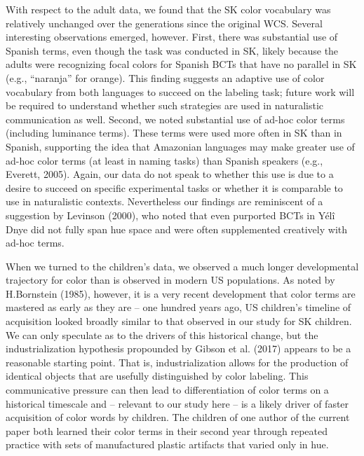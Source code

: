 \documentclass[
  english,
  ,man,floatsintext]{apa6}
\begin{document}
With respect to the adult data, we found that the SK color vocabulary was relatively unchanged over the generations since the original WCS. Several interesting observations emerged, however. First, there was substantial use of Spanish terms, even though the task was conducted in SK, likely because the adults were recognizing focal colors for Spanish BCTs that have no parallel in SK (e.g., \enquote{naranja} for orange). This finding suggests an adaptive use of color vocabulary from both languages to succeed on the labeling task; future work will be required to understand whether such strategies are used in naturalistic communication as well. Second, we noted substantial use of ad-hoc color terms (including luminance terms). These terms were used more often in SK than in Spanish, supporting the idea that Amazonian languages may make greater use of ad-hoc color terms (at least in naming tasks) than Spanish speakers (e.g., Everett, 2005). Again, our data do not speak to whether this use is due to a desire to succeed on specific experimental tasks or whether it is comparable to use in naturalistic contexts. Nevertheless our findings are reminiscent of a suggestion by Levinson (2000), who noted that even purported BCTs in Yélî Dnye did not fully span hue space and were often supplemented creatively with ad-hoc terms.

When we turned to the children's data, we observed a much longer developmental trajectory for color than is observed in modern US populations. As noted by H.Bornstein (1985), however, it is a very recent development that color terms are mastered as early as they are -- one hundred years ago, US children's timeline of acquisition looked broadly similar to that observed in our study for SK children. We can only speculate as to the drivers of this historical change, but the industrialization hypothesis propounded by Gibson et al. (2017) appears to be a reasonable starting point. That is, industrialization allows for the production of identical objects that are usefully distinguished by color labeling. This communicative pressure can then lead to differentiation of color terms on a historical timescale and -- relevant to our study here -- is a likely driver of faster acquisition of color words by children. The children of one author of the current paper both learned their color terms in their second year through repeated practice with sets of manufactured plastic artifacts that varied only in hue.
\end{document}
